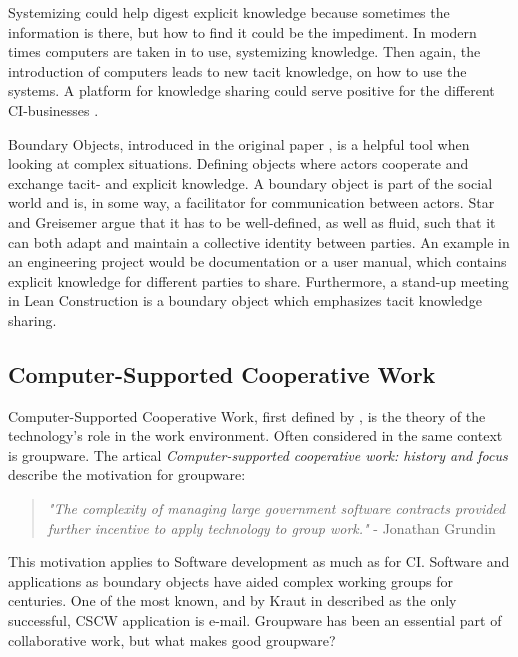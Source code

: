 Systemizing could help digest explicit knowledge because sometimes the information is there, but how to find it could be the impediment. In modern times computers are taken in to use, systemizing knowledge. Then again, the introduction of computers leads to new tacit knowledge, on how to use the systems. A platform for knowledge sharing could serve positive for the different CI-businesses \cite{kivrak2008capturing}. 

Boundary Objects, introduced in the original paper \cite{star&griesemer}, is a helpful tool when looking at complex situations. Defining objects where actors cooperate and exchange tacit- and explicit knowledge. A boundary object is part of the social world and is, in some way, a facilitator for communication between actors. Star and Greisemer argue that it has to be well-defined, as well as fluid, such that it can both adapt and maintain a collective identity between parties. An example in an engineering project would be documentation or a user manual, which contains explicit knowledge for different parties to share. Furthermore, a stand-up meeting in Lean Construction is a boundary object which emphasizes tacit knowledge sharing.

\subsection{Computer-Supported Cooperative Work}
Computer-Supported Cooperative Work, first defined by \cite{Friedman}, is the theory of the technology's role in the work environment. Often considered in the same context is groupware. The artical \textit{Computer-supported cooperative work: history and focus} \cite{Grudin} describe the motivation for groupware: 
\begin{quotation}
    \noindent \textit{"The complexity of managing large government software contracts provided further incentive to apply technology to group work."} - Jonathan Grundin
\end{quotation}
This motivation applies to Software development as much as for CI. Software and applications as boundary objects have aided complex working groups for centuries. One of the most known, and by Kraut in \cite{Kraut} described as the only successful, CSCW application is e-mail. Groupware has been an essential part of collaborative work, but what makes good groupware? 

